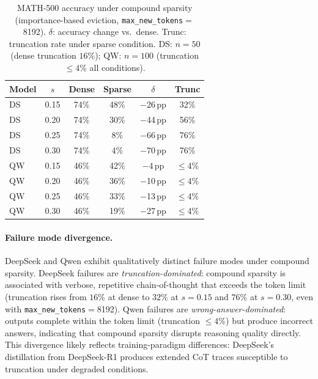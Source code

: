 \begin{table}[h]
\centering
\small
\caption{MATH-500 accuracy under compound sparsity (importance-based eviction, \texttt{max\_new\_tokens}${=}$8192). $\delta$: accuracy change vs.\ dense. Trunc: truncation rate under sparse condition. DS: $n{=}50$ (dense truncation $16\%$); QW: $n{=}100$ (truncation $\leq 4\%$ all conditions).}
\label{tab:accuracy}
\begin{tabular}{@{}lccccc@{}}
\toprule
Model & $s$ & Dense & Sparse & $\delta$ & Trunc \\
\midrule
DS & 0.15 & 74\% & 48\% & $-$26\,pp & 32\% \\
DS & 0.20 & 74\% & 30\% & $-$44\,pp & 56\% \\
DS & 0.25 & 74\% & 8\% & $-$66\,pp & 76\% \\
DS & 0.30 & 74\% & 4\% & $-$70\,pp & 76\% \\
\addlinespace
QW & 0.15 & 46\% & 42\% & $-$4\,pp & $\leq$4\% \\
QW & 0.20 & 46\% & 36\% & $-$10\,pp & $\leq$4\% \\
QW & 0.25 & 46\% & 33\% & $-$13\,pp & $\leq$4\% \\
QW & 0.30 & 46\% & 19\% & $-$27\,pp & $\leq$4\% \\
\bottomrule
\end{tabular}
\end{table}

\paragraph{Failure mode divergence.}
DeepSeek and Qwen exhibit qualitatively distinct failure modes under compound sparsity. DeepSeek failures are \emph{truncation-dominated}: compound sparsity is associated with verbose, repetitive chain-of-thought that exceeds the token limit (truncation rises from $16\%$ at dense to $32\%$ at $s{=}0.15$ and $76\%$ at $s{=}0.30$, even with \texttt{max\_new\_tokens}${=}$8192). Qwen failures are \emph{wrong-answer-dominated}: outputs complete within the token limit (truncation $\leq 4\%$) but produce incorrect answers, indicating that compound sparsity disrupts reasoning quality directly. This divergence likely reflects training-paradigm differences: DeepSeek's distillation from DeepSeek-R1 produces extended CoT traces susceptible to truncation under degraded conditions.

